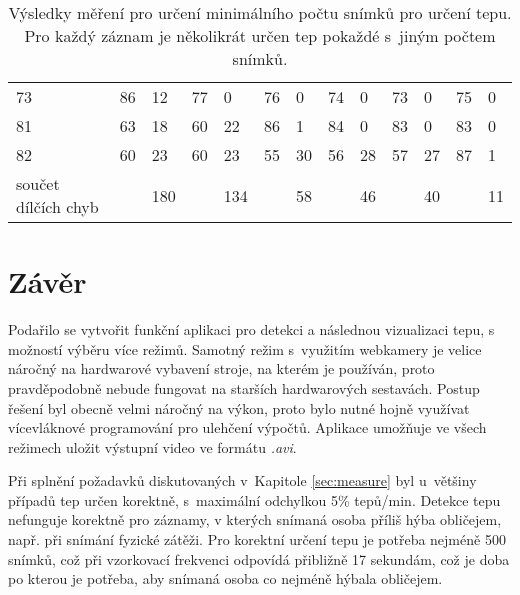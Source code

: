 \documentclass[
  digital, %
  table,   %
%
  lof,     %
  lot,     %
]{fithesis3}
\begin{document}
\begin{landscape}
\begin{table}
{\begin{tabular}{lllllllllllll}
73                                     & 86         & 12                & 77         & 0                 & 76         & 0                 & 74         & 0                 & 73         & 0                 & 75         & 0                 \\
81                                     & 63         & 18                & 60         & 22                & 86         & 1                 & 84         & 0                 & 83         & 0                 & 83         & 0                 \\
82                                     & 60         & 23                & 60         & 23                & 55         & 30                & 56         & 28                & 57         & 27                & 87         & 1                 \\
součet dílčích chyb                    &            & 180               &            & 134               &            & 58                &            & 46                &            & 40                &            & 11               
\end{tabular}}
\caption{Výsledky měření pro určení minimálního počtu snímků pro určení tepu. Pro každý záznam je několikrát určen tep pokaždé s~jiným počtem snímků.}
\end{table}
\end{landscape}


\chapter{Závěr}
Podařilo se vytvořit funkční aplikaci pro detekci a následnou vizualizaci tepu, s možností výběru více režimů. Samotný režim s~využitím webkamery je velice náročný na hardwarové vybavení stroje, na kterém je používán, proto pravděpodobně nebude fungovat na starších hardwarových sestavách. Postup řešení byl obecně velmi náročný na výkon, proto bylo nutné hojně využívat vícevláknové programování pro ulehčení výpočtů. Aplikace umožňuje ve všech režimech uložit výstupní video ve formátu \emph{.avi}.

Při splnění požadavků diskutovaných v~Kapitole \ref{sec:measure} byl u~většiny případů tep určen korektně, s~maximální odchylkou 5\% tepů/min. Detekce tepu nefunguje korektně pro záznamy, v kterých snímaná osoba příliš hýba obličejem, např. při snímání fyzické zátěži. Pro korektní určení tepu je potřeba nejméně 500 snímků, což při vzorkovací frekvenci odpovídá přibližně 17 sekundám, což je doba po kterou je potřeba, aby snímaná osoba co nejméně hýbala obličejem.
\end{document}
